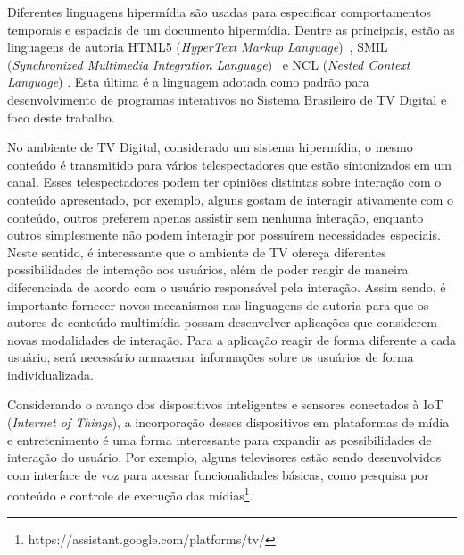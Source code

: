Diferentes linguagens hipermídia são usadas para especificar comportamentos temporais e espaciais de um documento hipermídia. Dentre as principais, estão as linguagens de autoria HTML5 (\textit{HyperText Markup Language})~\cite{W3C:2014aa}, SMIL (\textit{Synchronized Multimedia Integration Language})~\cite{ayers2001synchronized} e NCL (\textit{Nested Context Language}) \cite{ITU:2009ma}. Esta última é a linguagem adotada como padrão para desenvolvimento de programas interativos no Sistema Brasileiro de TV Digital \cite{ABNT:2011aa} e foco deste trabalho. 

No ambiente de TV Digital, considerado um sistema hipermídia, o mesmo conteúdo é transmitido para vários telespectadores que estão sintonizados em um canal. Esses telespectadores podem ter opiniões distintas sobre interação com o conteúdo apresentado, por exemplo, alguns gostam de interagir ativamente com o conteúdo, outros preferem apenas assistir sem nenhuma interação, enquanto outros simplesmente não podem interagir por possuírem necessidades especiais. Neste sentido, é interessante que o ambiente de TV ofereça diferentes possibilidades de interação aos usuários, além de poder reagir de maneira diferenciada de acordo com o usuário responsável pela interação. Assim sendo, é importante fornecer novos mecanismos nas linguagens de autoria para que os autores de conteúdo multimídia possam desenvolver aplicações que considerem novas modalidades de interação. Para a aplicação reagir de forma diferente a cada usuário, será necessário armazenar informações sobre os usuários de forma individualizada.

Considerando o avanço dos dispositivos inteligentes e sensores conectados à IoT (\emph{Internet of Things}), a incorporação desses dispositivos em  plataformas de mídia e entretenimento é uma forma interessante para expandir as possibilidades de interação do usuário. Por exemplo, alguns televisores estão sendo desenvolvidos com interface de voz para acessar funcionalidades básicas, como pesquisa por conteúdo e controle de execução das mídias\footnote{https://assistant.google.com/platforms/tv/}.

